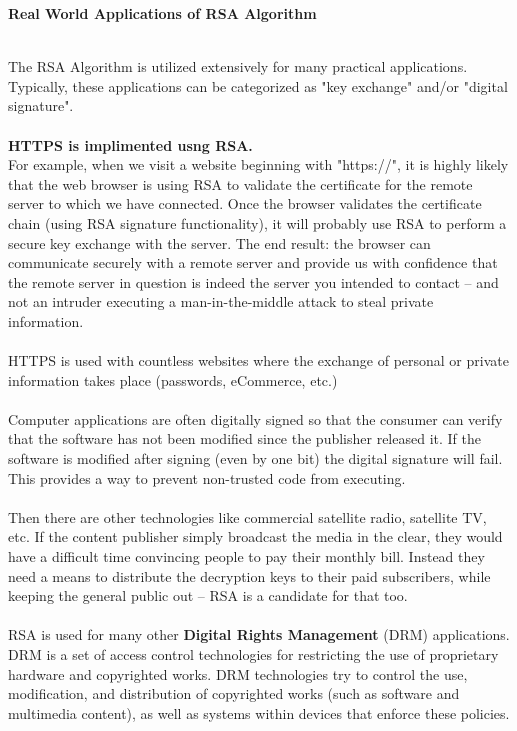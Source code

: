 \documentclass[12 pt]{article}
\begin{document}
{\pagebreak

\begin{LARGE}
\noindent \textbf{Real World Applications of RSA Algorithm}
\end{LARGE}\\[12 pt]
The RSA Algorithm is utilized extensively for many practical applications. Typically, these applications can be categorized as "key exchange" and/or "digital signature".
\\\\\textbf{HTTPS is implimented usng RSA.}
\\For example, when we visit a website beginning with "https://", it is highly likely that the web browser is using RSA to validate the certificate for the remote server to which we have connected. Once the browser validates the certificate chain (using RSA signature functionality), it will probably use RSA to perform a secure key exchange with the server. The end result: the browser can communicate securely with a remote server and provide us with confidence that the remote server in question is indeed the server you intended to contact -- and not an intruder executing a man-in-the-middle attack to steal private information.
\\\\HTTPS is used with countless websites where the exchange of personal or private information takes place (passwords, eCommerce, etc.)
\\\\Computer applications are often digitally signed so that the consumer can verify that the software has not been modified since the publisher released it. If the software is modified after signing (even by one bit) the digital signature will fail. This provides a way to prevent non-trusted code from executing.
\\\\Then there are other technologies like commercial satellite radio, satellite TV, etc. If the content publisher simply broadcast the media in the clear, they would have a difficult time convincing people to pay their monthly bill. Instead they need a means to distribute the decryption keys to their paid subscribers, while keeping the general public out -- RSA is a candidate for that too.
\\\\RSA is used for many other \textbf{Digital Rights Management} (DRM) applications. DRM is a set of access control technologies for restricting the use of proprietary hardware and copyrighted works. DRM technologies try to control the use, modification, and distribution of copyrighted works (such as software and multimedia content), as well as systems within devices that enforce these policies.
}
\end{document}
